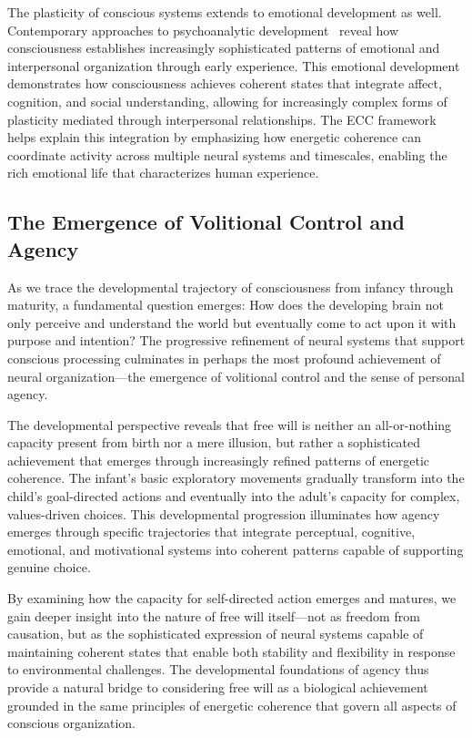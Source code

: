 The plasticity of conscious systems extends to emotional development as well. Contemporary approaches to psychoanalytic development~\cite{Stern2000, van2025processes} reveal how consciousness establishes increasingly sophisticated patterns of emotional and interpersonal organization through early experience. This emotional development demonstrates how consciousness achieves coherent states that integrate affect, cognition, and social understanding, allowing for increasingly complex forms of plasticity mediated through interpersonal relationships. The ECC framework helps explain this integration by emphasizing how energetic coherence can coordinate activity across multiple neural systems and timescales, enabling the rich emotional life that characterizes human experience.

\subsection*{The Emergence of Volitional Control and Agency}

As we trace the developmental trajectory of consciousness from infancy through maturity, a fundamental question emerges: How does the developing brain not only perceive and understand the world but eventually come to act upon it with purpose and intention? The progressive refinement of neural systems that support conscious processing culminates in perhaps the most profound achievement of neural organization—the emergence of volitional control and the sense of personal agency.

The developmental perspective reveals that free will is neither an all-or-nothing capacity present from birth nor a mere illusion, but rather a sophisticated achievement that emerges through increasingly refined patterns of energetic coherence. The infant's basic exploratory movements gradually transform into the child's goal-directed actions and eventually into the adult's capacity for complex, values-driven choices. This developmental progression illuminates how agency emerges through specific trajectories that integrate perceptual, cognitive, emotional, and motivational systems into coherent patterns capable of supporting genuine choice.

By examining how the capacity for self-directed action emerges and matures, we gain deeper insight into the nature of free will itself—not as freedom from causation, but as the sophisticated expression of neural systems capable of maintaining coherent states that enable both stability and flexibility in response to environmental challenges. The developmental foundations of agency thus provide a natural bridge to considering free will as a biological achievement grounded in the same principles of energetic coherence that govern all aspects of conscious organization.


